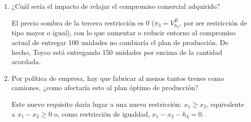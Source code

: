 \begin{enumerate}
    Siempre y cuando se disponga de una cantidad de minutos de montaje igual o superior a 4300 y menor o igual que 8500 la gama de productos sería la misma.

    \item ¿Cuál sería el impacto de relajar el compromiso comercial adquirido?

    El precio sombra de la tercera restricción es 0 ($\pi_3=V^B_{h_3}$, por ser restricción de tipo mayor o igual), con lo que aumentar o reducir entorno al compromiso actual de entregar 100 unidades no cambiaría el plan de producción. De hecho, Toyco está entregando 150 unidades por encima de la cantidad acordada.

    \item Por política de empresa, hay que fabricar al menos tantos trenes como camiones, ¿como afectaría esto al plan óptimo de producción?

    Este nuevo requisito daría lugar a una nueva restricción: $x_1 \geq x_2$, equivalente a $x_1 - x_2 \geq 0$ o, como restricción de igualdad, $x_1 - x_2 - h_4 = 0$.



\end{enumerate}
